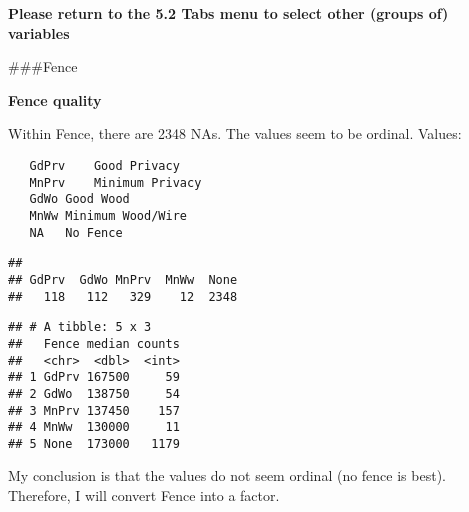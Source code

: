 \documentclass[]{article}
\newenvironment{Shaded}{\begin{snugshade}}{\end{snugshade}}
\newcommand{\DataTypeTok}[1]{\textcolor[rgb]{0.13,0.29,0.53}{#1}}
\newcommand{\KeywordTok}[1]{\textcolor[rgb]{0.13,0.29,0.53}{\textbf{#1}}}
\newcommand{\NormalTok}[1]{#1}
\newcommand{\OperatorTok}[1]{\textcolor[rgb]{0.81,0.36,0.00}{\textbf{#1}}}
\newcommand{\StringTok}[1]{\textcolor[rgb]{0.31,0.60,0.02}{#1}}
\begin{document}
\textbf{Please return to the 5.2 Tabs menu to select other (groups of)
variables}

\#\#\#Fence

\textbf{Fence quality}

Within Fence, there are 2348 NAs. The values seem to be ordinal. Values:

\begin{verbatim}
   GdPrv    Good Privacy
   MnPrv    Minimum Privacy
   GdWo Good Wood
   MnWw Minimum Wood/Wire
   NA   No Fence
\end{verbatim}

\begin{Shaded}
\end{Shaded}

\begin{verbatim}
## 
## GdPrv  GdWo MnPrv  MnWw  None 
##   118   112   329    12  2348
\end{verbatim}

\begin{Shaded}
\end{Shaded}

\begin{verbatim}
## # A tibble: 5 x 3
##   Fence median counts
##   <chr>  <dbl>  <int>
## 1 GdPrv 167500     59
## 2 GdWo  138750     54
## 3 MnPrv 137450    157
## 4 MnWw  130000     11
## 5 None  173000   1179
\end{verbatim}

My conclusion is that the values do not seem ordinal (no fence is best).
Therefore, I will convert Fence into a factor.

\begin{Shaded}
\end{Shaded}
\end{document}
